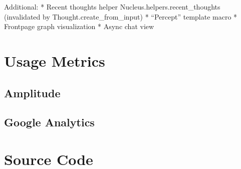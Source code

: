 Additional: * Recent thoughts helper Nucleus.helpers.recent\_thoughts
(invalidated by Thought.create\_from\_input) * ``Percept'' template
macro * Frontpage graph visualization * Async chat view

\section{Usage Metrics}\label{usage-metrics}

\subsection{Amplitude}\label{amplitude}

\subsection{Google Analytics}\label{google-analytics}

\section{Source Code}\label{source-code}


